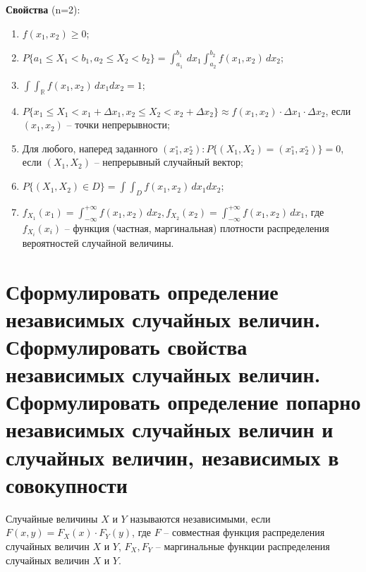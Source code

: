 \textbf{Свойства} (n=2):
\begin{enumerate}
	\item $f(x_1, x_2) \geq 0$;
	\item $P\{a_1 \leq X_1 < b_1, a_2 \leq X_2 < b_2\} = \int_{a_1}^{b_1} \, dx_1 \int_{a_2}^{b_2} f(x_1, x_2)\, dx_2$;
	\item $\int \int_{\mathbb{R}} f(x_1, x_2)\, dx_1dx_2 = 1$;
	\item $P\{x_1 \leq X_1 < x_1 + \Delta x_1, x_2 \leq X_2 < x_2 + \Delta x_2\} \approx f(x_1, x_2) \cdot \Delta x_1 \cdot \Delta x_2$, если $(x_1, x_2)$ -- точки непрерывности;
	\item Для любого, наперед заданного $(x_1^\circ, x_2^\circ): P\{(X_1, X_2) = (x_1^\circ, x_2^\circ)\} = 0$, если $(X_1, X_2)$ -- непрерывный случайный вектор;
	\item $P\{(X_1, X_2) \in D\} = \int \int_D f(x_1, x_2) \, dx_1dx_2$;
	\item $f_{X_1} (x_1) = \int_{- \infty}^{+\infty} f(x_1, x_2) \, dx_2, f_{X_2} (x_2) = \int_{- \infty}^{+\infty} f(x_1, x_2) \, dx_1$, где $f_{X_i}(x_i)$ -- функция (частная, маргинальная) плотности распределения вероятностей случайной величины.
\end{enumerate}


\section{Сформулировать определение независимых случайных величин. Сформулировать свойства независимых случайных величин. Сформулировать определение попарно независимых случайных величин и случайных величин, независимых в совокупности}

Случайные величины $X$ и $Y$ называются независимыми, если $F(x, y) = F_X(x) \cdot F_Y(y)$, где $F$ -- совместная функция распределения случайных величин $X$ и $Y$, $F_X, F_Y$ -- маргинальные функции распределения случайных величин $X$ и $Y$.

